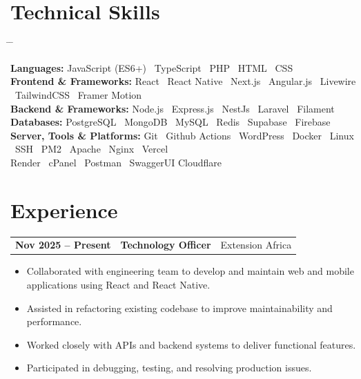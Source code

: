 \documentclass{article}
\makeatletter
\newcommand{\cventry}[3]{%
    \noindent
    \begin{tabular*}{\linewidth}{@{}p{4.5cm} p{9cm} @{\extracolsep{\fill}} r@{}}
        \textbf{\small #1} & \textbf{#2} & {\color{primarycolor}\small #3}
    \end{tabular*}
}
\makeatother
\begin{document}
\section{Technical Skills}
\begin{tabbing}
\hspace{5.0cm} \= \hspace{7.5cm} \= \kill

\textbf{{Languages:}} \> JavaScript (ES6+) \textbar\ TypeScript \textbar\ PHP \textbar\ HTML \textbar\ CSS  \\
\textbf{{Frontend \& Frameworks:}} \> React \textbar\ React Native \textbar\ Next.js \textbar\ Angular.js \textbar\ Livewire \textbar\ TailwindCSS \textbar\ Framer Motion  \\
\textbf{{Backend \& Frameworks:}} \> Node.js \textbar\ Express.js \textbar\ NestJs \textbar\ Laravel \textbar\ Filament \\
\textbf{{Databases:}} \> PostgreSQL \textbar\ MongoDB \textbar\ MySQL \textbar\ Redis \textbar\ Supabase \textbar\ Firebase \\
\textbf{{Server, Tools \& Platforms:}} \> Git \textbar\ Github Actions \textbar\ WordPress \textbar\ Docker \textbar\ Linux \textbar\ SSH \textbar\ PM2 \textbar\ Apache \textbar\ Nginx \textbar\ Vercel  \\
\> Render \textbar\ cPanel \textbar\ Postman \textbar\ SwaggerUI  Cloudflare 

\end{tabbing}

\vspace{-0.18cm}

\section{Experience}
\cventry{Nov 2025 -- Present}{Technology Officer}{Extension Africa}
\vspace{-0.4cm}
\begin{itemize}
    \item Collaborated with engineering team to develop and maintain web and mobile applications using React and React Native.
    \item Assisted in refactoring existing codebase to improve maintainability and performance.
    \item Worked closely with APIs and backend systems to deliver functional features.
    \item Participated in debugging, testing, and resolving production issues.
\end{itemize}
\end{document}
